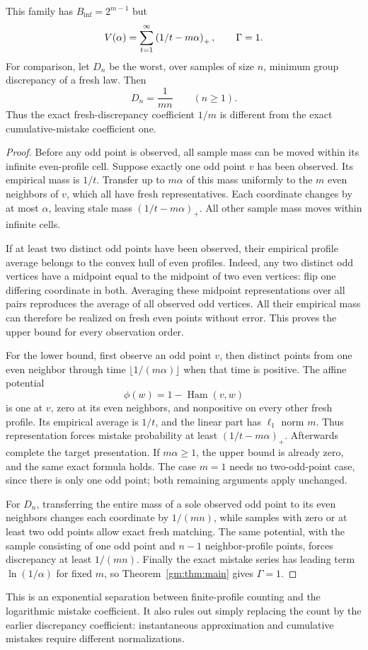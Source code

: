 \begin{proposition}\label{gm:prop:parity}
This family has $B_{\mathrm{inf}}=2^{m-1}$ but
\[
V(\alpha)=\sum_{t=1}^{\infty}\left(1/t-m\alpha\right)_+,\qquad \Gamma=1.
\]
For comparison, let $D_n$ be the worst, over samples of size $n$, minimum group discrepancy of a fresh law. Then
\[
D_n=\frac1{mn}\qquad(n\ge1).
\]
Thus the exact fresh-discrepancy coefficient $1/m$ is different from the exact cumulative-mistake coefficient one.
\end{proposition}
\begin{proof}
Before any odd point is observed, all sample mass can be moved within its infinite even-profile cell. Suppose exactly one odd point $v$ has been observed. Its empirical mass is $1/t$. Transfer up to $m\alpha$ of this mass uniformly to the $m$ even neighbors of $v$, which all have fresh representatives. Each coordinate changes by at most $\alpha$, leaving stale mass $(1/t-m\alpha)_+$. All other sample mass moves within infinite cells.

If at least two distinct odd points have been observed, their empirical profile average belongs to the convex hull of even profiles. Indeed, any two distinct odd vertices have a midpoint equal to the midpoint of two even vertices: flip one differing coordinate in both. Averaging these midpoint representations over all pairs reproduces the average of all observed odd vertices. All their empirical mass can therefore be realized on fresh even points without error. This proves the upper bound for every observation order.

For the lower bound, first observe an odd point $v$, then distinct points from one even neighbor through time $\lfloor1/(m\alpha)\rfloor$ when that time is positive. The affine potential
\[
\phi(w)=1-\operatorname{Ham}(v,w)
\]
is one at $v$, zero at its even neighbors, and nonpositive on every other fresh profile. Its empirical average is $1/t$, and the linear part has $\ell_1$ norm $m$. Thus representation forces mistake probability at least $(1/t-m\alpha)_+$. Afterwards complete the target presentation. If $m\alpha\ge1$, the upper bound is already zero, and the same exact formula holds. The case $m=1$ needs no two-odd-point case, since there is only one odd point; both remaining arguments apply unchanged.

For $D_n$, transferring the entire mass of a sole observed odd point to its even neighbors changes each coordinate by $1/(mn)$, while samples with zero or at least two odd points allow exact fresh matching. The same potential, with the sample consisting of one odd point and $n-1$ neighbor-profile points, forces discrepancy at least $1/(mn)$. Finally the exact mistake series has leading term $\ln(1/\alpha)$ for fixed $m$, so Theorem~\ref{gm:thm:main} gives $\Gamma=1$.
\end{proof}
This is an exponential separation between finite-profile counting and the logarithmic mistake coefficient. It also rules out simply replacing the count by the earlier discrepancy coefficient: instantaneous approximation and cumulative mistakes require different normalizations.

